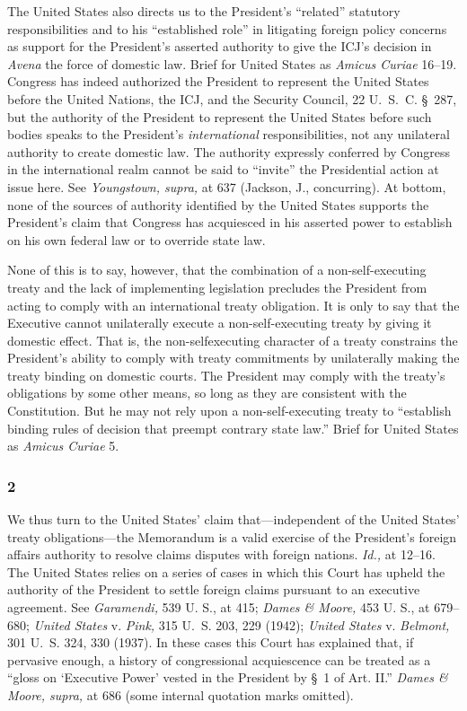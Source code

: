   The United States also directs us to the President's ``related''
statutory responsibilities and to his ``established role'' in
litigating foreign policy concerns as support for the President's
asserted authority to give the ICJ's decision in \emph{Avena} the
force of domestic law. Brief for United States as \emph{Amicus Curiae}
16--19. Congress has indeed authorized the President to represent
the United States before the United Nations, the ICJ, and the Security
Council, 22 U.~S.~C. \S~287, but the authority of the President
to represent the United \newpage  States before such bodies speaks to the
President's \emph{international} responsibilities, not any unilateral
authority to create domestic law. The authority expressly conferred by
Congress in the international realm cannot be said to ``invite'' the
Presidential action at issue here. See \emph{Youngstown, supra,} at 637
(Jackson, J., concurring). At bottom, none of the sources of authority
identified by the United States supports the President's claim that
Congress has acquiesced in his asserted power to establish on his own
federal law or to override state law.

  None of this is to say, however, that the combination of a
non-self-executing treaty and the lack of implementing legislation
precludes the President from acting to comply with an international
treaty obligation. It is only to say that the Executive cannot
unilaterally execute a non-self-executing treaty by giving it domestic
effect. That is, the non-selfexecuting character of a treaty constrains
the President's ability to comply with treaty commitments by
unilaterally making the treaty binding on domestic courts. The President
may comply with the treaty's obligations by some other means, so long
as they are consistent with the Constitution. But he may not rely upon a
non-self-executing treaty to ``establish binding rules of decision that
preempt contrary state law.'' Brief for United States as \emph{Amicus
Curiae} 5.

\subsubsection{2}

  We thus turn to the United States' claim that---independent of
the United States' treaty obligations---the Memorandum is a valid
exercise of the President's foreign affairs authority to resolve
claims disputes with foreign nations. \emph{Id.,} at 12--16. The
United States relies on a series of cases in which this Court has upheld
the authority of the President to settle foreign claims pursuant to an
executive agreement. See \emph{Garamendi,} 539 U. S., at 415; \emph{Dames
\& Moore,} 453 U. S., at 679--680; \emph{United States} v. \emph{Pink,}
315 U.~S. 203, 229 (1942); \newpage  \emph{United States} v. \emph{Belmont,}
301 U.~S. 324, 330 (1937). In these cases this Court has explained
that, if pervasive enough, a history of congressional acquiescence
can be treated as a ``gloss on ‘Executive Power' vested in the
President by \S~1 of Art. II.'' \emph{Dames \& Moore, supra,} at 686
(some internal quotation marks omitted).


